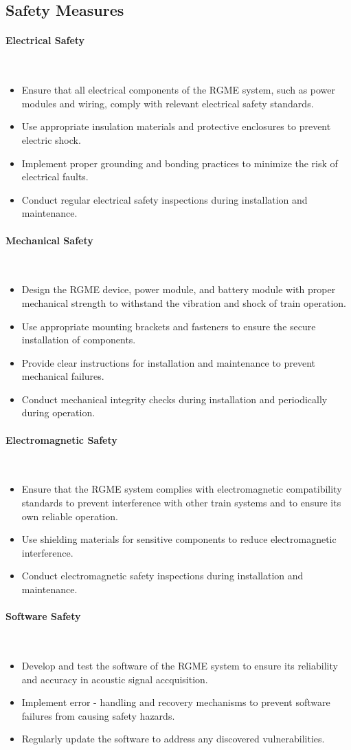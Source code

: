 \documentclass{article}
\newcommand{\subsubsubsection}[1]{\paragraph{#1}\mbox{}\\}
\begin{document}
\subsection{Safety Measures}
\subsubsubsection{Electrical Safety}
\begin{itemize}
    \item Ensure that all electrical components of the RGME system, such as power modules and wiring, comply with relevant electrical safety standards.
    \item Use appropriate insulation materials and protective enclosures to prevent electric shock.
    \item Implement proper grounding and bonding practices to minimize the risk of electrical faults.
    \item Conduct regular electrical safety inspections during installation and maintenance.
\end{itemize}
\subsubsubsection{Mechanical Safety}
\begin{itemize}
    \item Design the RGME device, power module, and battery module with proper mechanical strength to withstand the vibration and shock of train operation.
    \item Use appropriate mounting brackets and fasteners to ensure the secure installation of components.
    \item Provide clear instructions for installation and maintenance to prevent mechanical failures.
    \item Conduct mechanical integrity checks during installation and periodically during operation.
\end{itemize}
\subsubsubsection{Electromagnetic Safety}
\begin{itemize}
    \item Ensure that the RGME system complies with electromagnetic compatibility standards to prevent interference with other train systems and to ensure its own reliable operation.
    \item Use shielding materials for sensitive components to reduce electromagnetic interference.
    \item Conduct electromagnetic safety inspections during installation and maintenance.
\end{itemize}
\subsubsubsection{Software Safety}
\begin{itemize}
    \item Develop and test the software of the RGME system to ensure its reliability and accuracy in acoustic signal accquisition.
    \item Implement error - handling and recovery mechanisms to prevent software failures from causing safety hazards.
    \item Regularly update the software to address any discovered vulnerabilities.
\end{itemize}
\end{document}
